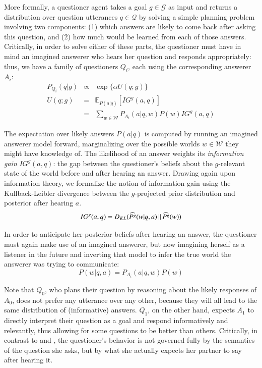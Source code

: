 \documentclass[12pt, floatsintext, jou]{apa6}
\newcommand{\KL}[2]{\ensuremath{D_{KL}({#1}\, \| \, {#2})}}
\newcommand{\E}[2]{\ensuremath{\mathbb{E}_{#1}\left [#2 \right]}}
\begin{document}
More formally, a questioner agent takes a goal $g \in \mathcal{G}$ as input and returns a distribution over question utterances $q \in \mathcal{Q}$ by solving a simple planning problem involving two components: (1) which answers are likely to come back after asking this question, and (2) how much would be learned from each of those answers. Critically, in order to solve either of these parts, the questioner must have in mind an imagined answerer who hears her question and responds appropriately: thus, we have a family of questioners $Q_i$, each using the corresponding answerer $A_i$:
%
$$
\begin{array}{lcl}
P_{Q_i}(q|g)  & \propto & \exp\{\alpha U(q;g)\} \\
U(q;g) & = & \E{P(a|q)}{IG^g(a,q)} \\
	 & = & \sum_{w\in\mathcal{W}} P_{A_i}(a|q,w)P(w) IG^g(a,q)
\end{array}
$$
%

The expectation over likely answers $P(a|q)$ is computed by running an imagined answerer model forward, marginalizing over the possible worlds $w \in\mathcal{W}$ they might have knowledge of. The likelihood of an answer weights its \emph{information gain} $IG^g(a,q)$: the gap between the questioner's beliefs about the $g$-relevant state of the world before and after hearing an answer. Drawing again upon information theory, we formalize the notion of information gain using the Kullback-Leibler divergence between the $g$-projected prior distribution and posterior after hearing $a$.
%
$$
IG^g(a,q) = \KL{\widehat{P^g}(w|q, a)}{\widehat{P^g}(w)}\\
$$
%

In order to anticipate her posterior beliefs after hearing an answer, the questioner must again make use of an imagined answerer, but now imagining herself as a listener in the future and inverting that model to infer the true world the answerer was trying to communicate:
$$P(w|q,a) = P_{A_i}(a| q, w)P(w)$$

Note that $Q_0$, who plans their question by reasoning about the likely responses of $A_0$, does not prefer any utterance over any other, because they will all lead to the same distribution of (informative) answers. $Q_1$, on the other hand, expects $A_1$ to directly interpret their question as a goal and respond informatively and relevantly, thus allowing for some questions to be better than others. Critically, in contrast to  and , the questioner's behavior is not governed fully by the semantics of the question she asks, but by what she actually expects her partner to say after hearing it.
\end{document}

